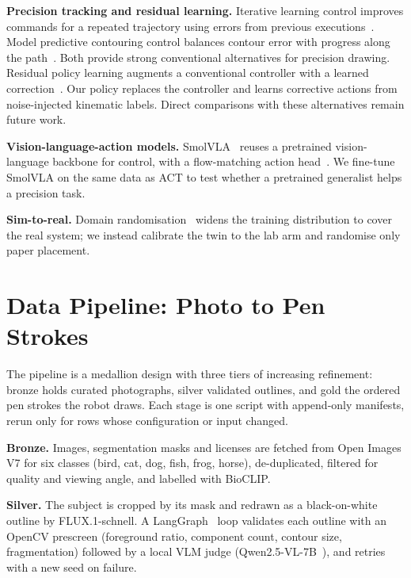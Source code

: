 \documentclass[conference]{IEEEtran}
\begin{document}
\textbf{Precision tracking and residual learning.} Iterative learning control improves commands for a repeated
trajectory using errors from previous executions~\cite{bristow2006ilc}. Model predictive contouring control
balances contour error with progress along the path~\cite{lam2010mpcc}. Both provide strong conventional
alternatives for precision drawing. Residual policy learning augments a conventional controller with a learned
correction~\cite{silver2018residual,johannink2019residual}. Our policy replaces the controller and learns
corrective actions from noise-injected kinematic labels. Direct comparisons with these alternatives remain
future work.

\textbf{Vision-language-action models.} SmolVLA~\cite{shukor2025smolvla} reuses a pretrained vision-language
backbone for control, with a flow-matching action head~\cite{lipman2023flow}. We fine-tune SmolVLA on the same data as ACT to test whether a pretrained
generalist helps a precision task.

\textbf{Sim-to-real.} Domain randomisation~\cite{tobin2017domain} widens the training distribution to cover the
real system; we instead calibrate the twin to the lab arm and randomise only paper placement.

\section{Data Pipeline: Photo to Pen Strokes}
\label{sec:pipeline}

The pipeline is a medallion design with three tiers of increasing refinement: bronze holds curated photographs,
silver validated outlines, and gold the ordered pen strokes the robot draws. Each stage is one script with
append-only manifests, rerun only for rows whose configuration or input changed.

\textbf{Bronze.} Images, segmentation masks and licenses are fetched from Open Images V7 for six classes (bird,
cat, dog, fish, frog, horse), de-duplicated, filtered for quality and viewing angle, and labelled with BioCLIP.

\textbf{Silver.} The subject is cropped by its mask and redrawn as a black-on-white outline by FLUX.1-schnell.
A LangGraph~\cite{langgraph} loop validates each outline with an OpenCV prescreen (foreground ratio, component
count, contour size, fragmentation) followed by a local VLM judge (Qwen2.5-VL-7B~\cite{bai2025qwen25vl}), and
retries with a new seed on failure.
\end{document}

